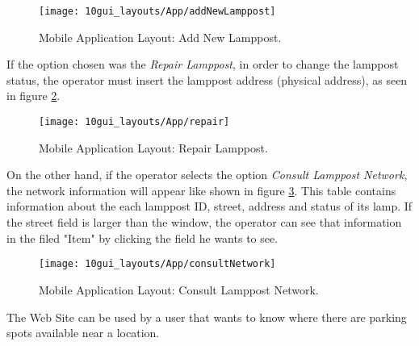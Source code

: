 \begin{figure}[H]
	\centering	
	\texttt{[image: 10gui\_layouts/App/addNewLamppost]}
	\caption{Mobile Application Layout: Add New Lamppost.}
	\label{fig:addNewLamppost}
\end{figure}

\clearpage
If the option chosen was the \textit{Repair Lamppost}, in order to change the lamppost status, the operator must insert the lamppost address (physical address), as seen in figure \ref{fig:repair}.

\begin{figure}[H]
	\centering	
	\texttt{[image: 10gui\_layouts/App/repair]}
	\caption{Mobile Application Layout: Repair Lamppost.}
	\label{fig:repair}
\end{figure}


\clearpage
On the other hand, if the operator selects the option \textit{Consult Lamppost Network}, the network information will appear like shown in figure \ref{fig:consultNetwork}. This table contains information about the each lamppost ID, street, address and status of its lamp. If the street field is larger than the window, the operator can see that information in the filed "Item" by clicking the field he wants to see.

\begin{figure}[H]
	\centering	
	\texttt{[image: 10gui\_layouts/App/consultNetwork]}
	\caption{Mobile Application Layout: Consult Lamppost Network.}
	\label{fig:consultNetwork}
\end{figure}

\clearpage
{}

The Web Site can be used by a user that wants to know where there are parking spots available near a location. 

